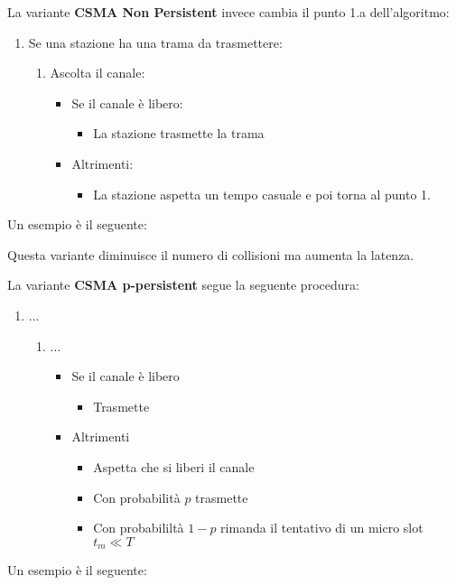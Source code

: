 \documentclass[a4paper]{article}
\begin{document}
La variante \textbf{CSMA Non Persistent} invece cambia il punto 1.a dell'algoritmo:
\begin{enumerate}
  \item Se una stazione ha una trama da trasmettere:
  \begin{enumerate}
    \item Ascolta il canale:
      \begin{itemize}
        \item Se il canale è libero:
          \begin{itemize}
            \item La stazione trasmette la trama
          \end{itemize}

        \item Altrimenti:
          \begin{itemize}
            \item La stazione aspetta un tempo casuale e poi torna al punto 1.
          \end{itemize}
      \end{itemize}
  \end{enumerate}
\end{enumerate}

\begin{example}
  Un esempio è il seguente:
  \label{04-12-D6}
\end{example}
Questa variante diminuisce il numero di collisioni ma aumenta la latenza.

\vspace{1em}
\noindent
La variante \textbf{CSMA p-persistent} segue la seguente procedura:
\begin{enumerate}
  \item ...
    
    \begin{enumerate}
      \item ...
        \begin{itemize}
          \item Se il canale è libero
            \begin{itemize}
              \item Trasmette
            \end{itemize}

          \item Altrimenti
            \begin{itemize}
              \item Aspetta che si liberi il canale
              \item Con probabilità \( p \) trasmette
              \item Con probabililtà \( 1 - p \) rimanda il tentativo di un micro slot \( t_m \ll T \) 
            \end{itemize}
        \end{itemize}
    \end{enumerate}
\end{enumerate}
\begin{example}
  Un esempio è il seguente:
  \label{04-12-D7}
\end{example}
\end{document}
